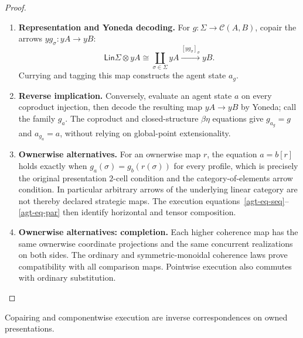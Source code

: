 \documentclass[11pt,a4paper]{article}
\numberwithin{equation}{section}
\theoremstyle{definition}
\theoremstyle{remark}
\theoremstyle{plain}
\providecommand{\Lin}{\mathsf{Lin}}
\providecommand{\cC}{\mathcal{C}}
\providecommand{\id}{\mathop{\mathrm{id}}}
\begin{document}
\begin{proof}
\leavevmode
\begin{enumerate}[label=\textup{(\arabic*)},leftmargin=*,itemsep=4pt,topsep=3pt]
  \item \textbf{Representation and Yoneda decoding.} For $g:\Sigma\to\cC(A,B)$, copair the arrows $yg_\sigma:yA\to yB$:
\[
 \Lin\Sigma\otimes yA\cong\coprod_{\sigma\in\Sigma}yA
 \xrightarrow{[yg_\sigma]_\sigma}yB.
\]
Currying and tagging this map constructs the agent state $a_g$.
  \item \textbf{Reverse implication.} Conversely, evaluate an agent state $a$ on every coproduct injection,
then decode the resulting map $yA\to yB$ by Yoneda; call the family
$g_a$. The coproduct and closed-structure $\beta\eta$ equations give
$g_{a_g}=g$ and $a_{g_a}=a$, without relying on global-point
extensionality.
  \item \textbf{Ownerwise alternatives.} For an ownerwise map $r$, the equation $a=b[r]$
holds exactly when $g_a(\sigma)=g_b(r(\sigma))$ for every profile,
which is precisely the original presentation $2$-cell condition and the
category-of-elements arrow condition. In particular arbitrary arrows of
the underlying linear category are not thereby declared strategic maps. The execution equations~\eqref{agt-eq-seq}--\eqref{agt-eq-par} then
identify horizontal and tensor composition.
  \item \textbf{Ownerwise alternatives: completion.} Each higher coherence map
has the same ownerwise coordinate projections and the same concurrent
realizations on both sides. The ordinary and symmetric-monoidal coherence
laws prove compatibility with all comparison maps. Pointwise execution
also commutes with ordinary substitution.
\end{enumerate}
\end{proof}

\noindent Copairing and componentwise execution are inverse correspondences on owned presentations.
\begin{center}
\end{center}
\end{document}
